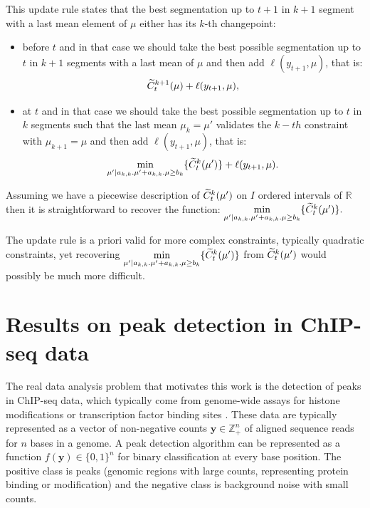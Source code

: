 \documentclass{article}
\newcommand{\ZZ}{\mathbb Z}
\begin{document}
This update rule states that the best segmentation up to $t+1$ in $k+1$ segment with a last mean element of $\mu$ either has its $k$-th changepoint:
\begin{itemize}
\item before $t$ and in that case we should take the best possible segmentation up to $t$ in $k+1$
segments with a last mean of $\mu$ and then add  $\ell(y_{t+1}, \mu)$, that is:
$$\widetilde{C}^{k+1}_{t}(\mu) + \ell(y_{t+1}, \mu),$$

\item at $t$ and in that case we should take the best possible segmentation up to $t$ in $k$ segments
such that the last mean $\mu_k=\mu'$ validates the $k-th$ constraint with $\mu_{k+1}=\mu$ and then add  $\ell(y_{t+1}, \mu)$, that is:
 $$\underset{\mu' | a_{k,k}. \mu' + a_{k,k}. \mu  \geq  b_{k}}{\min} \{ \widetilde{C}^{k}_{t}(\mu') \} + \ell(y_{t+1}, \mu).$$
\end{itemize}


Assuming we have a piecewise description of $\widetilde{C}^{k}_{t}(\mu')$ on $I$ ordered intervals of $\mathbb{R}$
then it is straightforward to recover the function:
$\underset{\mu' | a_{k,k}. \mu' + a_{k,k}. \mu  \geq  b_{k}}{\min} \{ \widetilde{C}^{k}_{t}(\mu') \}.$

The update rule is a priori valid for more complex constraints, typically quadratic constraints, yet recovering
$\underset{\mu' | a_{k,k}. \mu' + a_{k,k}. \mu  \geq  b_{k}}{\min} \{ \widetilde{C}^{k}_{t}(\mu') \}$ from $\widetilde{C}^{k}_{t}(\mu')$ would possibly be much more difficult.


\section{Results on peak detection in ChIP-seq data}
\label{sec:results-chip-seq}

The real data analysis problem that motivates this work is the
detection of peaks in ChIP-seq data, which typically come from
genome-wide assays for histone modifications or transcription factor
binding sites \citep{practical}. These data are typically represented
as a vector of non-negative counts $\mathbf y\in\ZZ_+^n$ of aligned
sequence reads for $n$ bases in a genome. A peak detection algorithm
can be represented as a function $f(\mathbf y)\in\{0,1\}^n$ for binary
classification at every base position. The positive class is peaks
(genomic regions with large counts, representing protein binding or
modification) and the negative class is background noise with small
counts.
\end{document}
